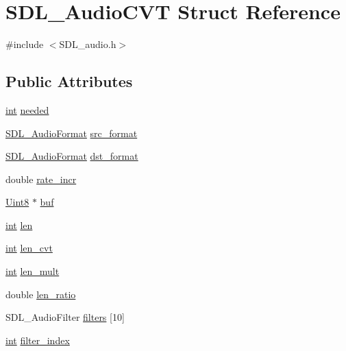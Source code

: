 \hypertarget{struct_s_d_l___audio_c_v_t}{\section{S\-D\-L\-\_\-\-Audio\-C\-V\-T Struct Reference}
\label{struct_s_d_l___audio_c_v_t}
}


{\ttfamily \#include $<$S\-D\-L\-\_\-audio.\-h$>$}

\subsection*{Public Attributes}
\begin{DoxyCompactItemize}
\item 
\hyperlink{_s_d_l__thread_8h_a6a64f9be4433e4de6e2f2f548cf3c08e}{int} \hyperlink{struct_s_d_l___audio_c_v_t_ac600a035a48df05e14d3712fd6953ad4}{needed}
\item 
\hyperlink{_s_d_l__audio_8h_a491ed103fd25d920c4e6b7495217ce66}{S\-D\-L\-\_\-\-Audio\-Format} \hyperlink{struct_s_d_l___audio_c_v_t_a6ae81231e017105e6d5e745a51732e16}{src\-\_\-format}
\item 
\hyperlink{_s_d_l__audio_8h_a491ed103fd25d920c4e6b7495217ce66}{S\-D\-L\-\_\-\-Audio\-Format} \hyperlink{struct_s_d_l___audio_c_v_t_a8f890d017be857a3b048bf00525736c6}{dst\-\_\-format}
\item 
double \hyperlink{struct_s_d_l___audio_c_v_t_ad886122c23a6673073baace31bff3b6c}{rate\-\_\-incr}
\item 
\hyperlink{_s_d_l__stdinc_8h_a2944638813a090aa23e62f4da842c3e2}{Uint8} $\ast$ \hyperlink{struct_s_d_l___audio_c_v_t_a080db27b929efa983c5161360ffce310}{buf}
\item 
\hyperlink{_s_d_l__thread_8h_a6a64f9be4433e4de6e2f2f548cf3c08e}{int} \hyperlink{struct_s_d_l___audio_c_v_t_aeaeb8c5a63c3ab96471fbfdf412c78ff}{len}
\item 
\hyperlink{_s_d_l__thread_8h_a6a64f9be4433e4de6e2f2f548cf3c08e}{int} \hyperlink{struct_s_d_l___audio_c_v_t_a5c60163f34d1947e5b166c23aba9879d}{len\-\_\-cvt}
\item 
\hyperlink{_s_d_l__thread_8h_a6a64f9be4433e4de6e2f2f548cf3c08e}{int} \hyperlink{struct_s_d_l___audio_c_v_t_ac9662d47cf2348b82b27b151150116b0}{len\-\_\-mult}
\item 
double \hyperlink{struct_s_d_l___audio_c_v_t_a5628ff5ccf711de9d77c0a4a9f57d2f0}{len\-\_\-ratio}
\item 
S\-D\-L\-\_\-\-Audio\-Filter \hyperlink{struct_s_d_l___audio_c_v_t_aeec0ebddc5e142bbafcc94a6014ad23e}{filters} \mbox{[}10\mbox{]}
\item 
\hyperlink{_s_d_l__thread_8h_a6a64f9be4433e4de6e2f2f548cf3c08e}{int} \hyperlink{struct_s_d_l___audio_c_v_t_a35093b3ad3331c17416c593a76012b63}{filter\-\_\-index}
\end{DoxyCompactItemize}


